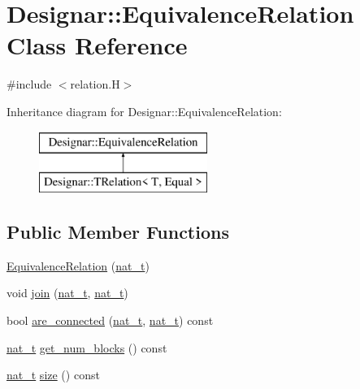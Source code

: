 \hypertarget{class_designar_1_1_equivalence_relation}{}\section{Designar\+:\+:Equivalence\+Relation Class Reference}
\label{class_designar_1_1_equivalence_relation}


{\ttfamily \#include $<$relation.\+H$>$}

Inheritance diagram for Designar\+:\+:Equivalence\+Relation\+:\begin{figure}[H]
\begin{center}
\leavevmode
\includegraphics[height=2.000000cm]{class_designar_1_1_equivalence_relation}
\end{center}
\end{figure}
\subsection*{Public Member Functions}
\begin{DoxyCompactItemize}
\item 
\hyperlink{class_designar_1_1_equivalence_relation_a44544ffad6df87c47b30a6cd2a7254f2}{Equivalence\+Relation} (\hyperlink{namespace_designar_aa72662848b9f4815e7bf31a7cf3e33d1}{nat\+\_\+t})
\item 
void \hyperlink{class_designar_1_1_equivalence_relation_a06f07c2d9d53919339afcdd369daa277}{join} (\hyperlink{namespace_designar_aa72662848b9f4815e7bf31a7cf3e33d1}{nat\+\_\+t}, \hyperlink{namespace_designar_aa72662848b9f4815e7bf31a7cf3e33d1}{nat\+\_\+t})
\item 
bool \hyperlink{class_designar_1_1_equivalence_relation_a98972f1d96957b9fac030ca3001094e6}{are\+\_\+connected} (\hyperlink{namespace_designar_aa72662848b9f4815e7bf31a7cf3e33d1}{nat\+\_\+t}, \hyperlink{namespace_designar_aa72662848b9f4815e7bf31a7cf3e33d1}{nat\+\_\+t}) const
\item 
\hyperlink{namespace_designar_aa72662848b9f4815e7bf31a7cf3e33d1}{nat\+\_\+t} \hyperlink{class_designar_1_1_equivalence_relation_a1de9de1745175828d1b3f0184df76920}{get\+\_\+num\+\_\+blocks} () const
\item 
\hyperlink{namespace_designar_aa72662848b9f4815e7bf31a7cf3e33d1}{nat\+\_\+t} \hyperlink{class_designar_1_1_equivalence_relation_abd7ed9854a58f13f215507e50c0eecd3}{size} () const
\end{DoxyCompactItemize}


